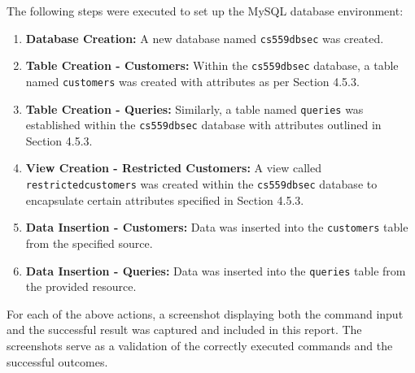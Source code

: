 \documentclass{article}
\begin{document}
The following steps were executed to set up the MySQL database environment:

\begin{enumerate}
    \item \textbf{Database Creation:} A new database named \texttt{cs559dbsec} was created.
    
    \item \textbf{Table Creation - Customers:} Within the \texttt{cs559dbsec} database, a table named \texttt{customers} was created with attributes as per Section 4.5.3.
    
    \item \textbf{Table Creation - Queries:} Similarly, a table named \texttt{queries} was established within the \texttt{cs559dbsec} database with attributes outlined in Section 4.5.3.
    
    \item \textbf{View Creation - Restricted Customers:} A view called \texttt{restrictedcustomers} was created within the \texttt{cs559dbsec} database to encapsulate certain attributes specified in Section 4.5.3.
    
    \item \textbf{Data Insertion - Customers:} Data was inserted into the \texttt{customers} table from the specified source.
    
    \item \textbf{Data Insertion - Queries:} Data was inserted into the \texttt{queries} table from the provided resource.
\end{enumerate}

For each of the above actions, a screenshot displaying both the command input and the successful result was captured and included in this report. The screenshots serve as a validation of the correctly executed commands and the successful outcomes.
\end{document}
